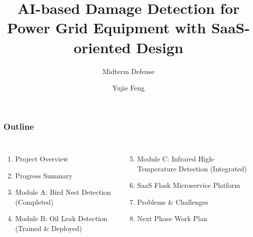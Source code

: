 \documentclass[aspectratio=169]{beamer}
\title{AI-based Damage Detection for Power Grid Equipment with SaaS-oriented Design}
\subtitle{Midterm Defense}
\author{Yujie Feng}
\institute{Supervisor: Jin Hou}
\date{}
\begin{document}
\begin{frame}
  \titlepage
\end{frame}

\begin{frame}
\frametitle{Outline}
\vspace{-5pt}
\begin{columns}
\begin{enumerate}
  \item Project Overview
  \item Progress Summary
  \item Module A: Bird Nest Detection (Completed)
  \item Module B: Oil Leak Detection (Trained \& Deployed)
\end{enumerate}

\begin{enumerate}
  \setcounter{enumi}{4}
  \item Module C: Infrared High-Temperature Detection (Integrated)
  \item SaaS Flask Microservice Platform
  \item Problems \& Challenges
  \item Next Phase Work Plan
\end{enumerate}
\end{columns}
\end{frame}
\end{document}
